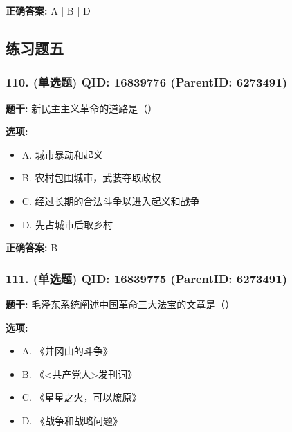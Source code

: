 \documentclass[12pt,UTF8]{ctexart}
\begin{document}
\textbf{正确答案:}
A | B | D

\vspace{0.3em}\hrulefill\vspace{0.7em}

\subsection*{练习题五}

\subsubsection*{110. (单选题) \small QID: 16839776 (ParentID: 6273491)}

\textbf{题干:}
新民主主义革命的道路是（）



\textbf{选项:}
\begin{itemize}[leftmargin=*]

  \item A. 城市暴动和起义

  \item B. 农村包围城市，武装夺取政权

  \item C. 经过长期的合法斗争以进入起义和战争

  \item D. 先占城市后取乡村

\end{itemize}

\textbf{正确答案:}
B

\vspace{0.3em}\hrulefill\vspace{0.7em}

\subsubsection*{111. (单选题) \small QID: 16839775 (ParentID: 6273491)}

\textbf{题干:}
毛泽东系统阐述中国革命三大法宝的文章是（）



\textbf{选项:}
\begin{itemize}[leftmargin=*]

  \item A. 《井冈山的斗争》

  \item B. 《<共产党人>发刊词》

  \item C. 《星星之火，可以燎原》

  \item D. 《战争和战略问题》

\end{itemize}
\end{document}
